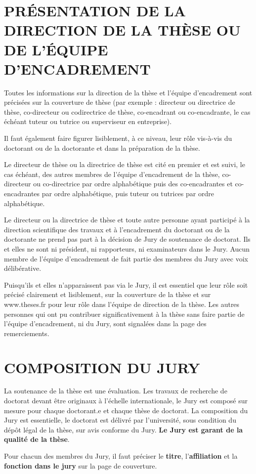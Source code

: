\documentclass[french,12pt,a4paper]{book}
\begin{document}
\chapter{PRÉSENTATION DE LA DIRECTION DE LA THÈSE OU DE L’ÉQUIPE D’ENCADREMENT}
Toutes les informations sur la direction de la thèse et l’équipe d’encadrement sont précisées sur la couverture de thèse (par exemple : directeur ou directrice de thèse, co-directeur ou codirectrice de thèse, co-encadrant ou co-encadrante, le cas échéant tuteur ou tutrice ou superviseur en entreprise).\\ \par
Il faut également faire figurer lisiblement, à ce niveau, leur rôle vis-à-vis du doctorant ou de la doctorante et dans la préparation de la thèse.\\ \par
Le directeur de thèse ou la directrice de thèse est cité en premier et est suivi, le cas échéant, des autres membres de l’équipe d’encadrement de la thèse, co-directeur ou co-directrice par ordre alphabétique puis des co-encadrantes et co-encadrantes par ordre alphabétique, puis tuteur ou tutrices par ordre alphabétique.\\ \par
Le directeur ou la directrice de thèse et toute autre personne ayant participé à la direction scientifique des travaux et à l’encadrement du doctorant ou de la doctorante ne prend pas part à la décision de Jury de soutenance de doctorat. Ils et elles ne sont ni président, ni rapporteurs, ni examinateurs dans le Jury. Aucun membre de l’équipe d’encadrement de fait partie des membres du Jury avec voix délibérative. \\ \par
Puisqu’ils et elles n’apparaissent pas via le Jury, il est essentiel que leur rôle soit précisé clairement et lisiblement, sur la couverture de la thèse et sur www.theses.fr pour leur rôle dans l’équipe de direction de la thèse.
Les autres personnes qui ont pu contribuer significativement à la thèse sans faire partie de l’équipe d’encadrement, ni du Jury, sont signalées dans la page des remerciements. 


\chapter{COMPOSITION DU JURY }
La soutenance de la thèse est une évaluation. Les travaux de recherche de doctorat devant être originaux à l’échelle internationale, le Jury est composé sur mesure pour chaque doctorant.e et chaque thèse de doctorat. La composition du Jury est essentielle, le doctorat est délivré par l’université, sous condition du dépôt légal de la thèse, sur avis conforme du Jury. \textbf{Le Jury est garant de la qualité de la thèse}.\\ \par
Pour chacun des membres du Jury, il faut préciser le \textbf{titre}, l’\textbf{affiliation} et la \textbf{fonction dans le jury} sur la page de couverture.
\end{document}
